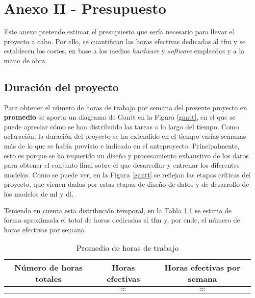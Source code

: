 \chapter{Anexo II - Presupuesto}

Este anexo pretende estimar el presupuesto que sería necesario para llevar el proyecto a cabo. Por ello, se cuantifican las horas efectivas dedicadas al \gls{tfm} y se establecen los costes, en base a los medios \textit{hardware} y \textit{software} empleados y a la mano de obra.

\section{Duración del proyecto}

Para obtener el número de horas de trabajo por semana del presente proyecto en \textbf{promedio} se aporta un diagrama de Gantt en la Figura \ref{gantt}, en el que se puede apreciar cómo se han distribuido las tareas a lo largo del tiempo. Como aclaración, la duración del proyecto se ha extendido en el tiempo varias semanas más de lo que se había previsto e indicado en el anteproyecto. Principalmente, esto es porque se ha requerido un diseño y procesamiento exhaustivo de los datos para obtener el conjunto final sobre el que desarrollar y entrenar los diferentes modelos. Como se puede ver, en la Figura \ref{gantt} se reflejan las etapas críticas del proyecto, que vienen dadas por estas etapas de diseño de datos y de desarrollo de los modelos de \gls{ml} y \gls{dl}. 

\vspace{3mm}

Teniendo en cuenta esta distribución temporal, en la Tabla \ref{dig:horasTrabajadas} se estima de forma aproximada el total de horas dedicadas al \gls{tfm} y, por ende, el número de horas efectivas por semana.

\vspace{3mm}

\begin{table}[ht!]
    \centering
    \begin{tabular}{|c|c|c|}
    \hline
    \rowcolor[HTML]{EFEFEF}
    \textbf{Número de horas totales} & \textbf{Horas efectivas} & \textbf{Horas efectivas por semana} \\ \hline
                                & $\approx$    & $\approx$                        \\ \hline
    \end{tabular}
    \caption{Promedio de horas de trabajo }
    \label{dig:horasTrabajadas}
\end{table}

